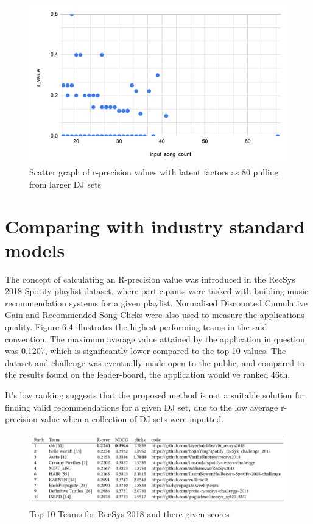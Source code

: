 \begin{figure}[H]
	\includegraphics[scale=0.6]{images/80_big_sets}
	\centering
	\caption{Scatter graph of r-precision values with latent factors as 80 pulling from larger DJ sets} 
\end{figure}


\section{Comparing with industry standard models}

	The concept of calculating an R-precision value was introduced in the RecSys 2018 Spotify playlist dataset, where participants were tasked with building music recommendation systems for a given playlist. Normalised Discounted Cumulative Gain and Recommended Song Clicks were also used to measure the applications quality. Figure 6.4 illustrates the highest-performing teams in the said convention. The maximum average value attained by the application in question was 0.1207, which is significantly lower compared to the top 10 values. The dataset and challenge was eventually made open to the public, and compared to the results found on the leader-board, the application would've ranked 46th. 

It's low ranking suggests that the proposed method is not a suitable solution for finding valid recommendations for a given DJ set, due to the low average r-precision value when a collection of DJ sets were inputted.
\begin{figure}[H]
	\hspace*{-0.5cm} 
	\includegraphics[scale=0.55]{images/recsys_scores}
	\caption{Top 10 Teams for RecSys 2018 and there given scores \citep{zamani_analysis_2019}} 
\end{figure}


